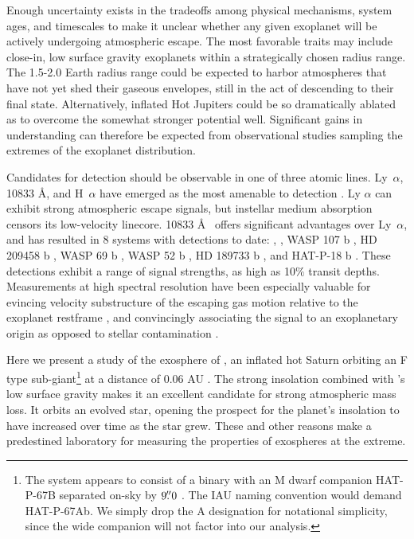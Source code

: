 \documentclass[twocolumn]{aastex631}
\begin{document}
Enough uncertainty exists in the tradeoffs among physical mechanisms, system ages, and timescales to make it unclear whether any given exoplanet will be actively undergoing atmospheric escape.  The most favorable traits may include close-in, low surface gravity exoplanets within a strategically chosen radius range.  The 1.5-2.0 Earth radius range could be expected to harbor atmospheres that have not yet shed their gaseous envelopes, still in the act of descending to their final state.  Alternatively, inflated Hot Jupiters could be so dramatically ablated as to overcome the somewhat stronger potential well.  Significant gains in understanding can therefore be expected from observational studies sampling the extremes of the exoplanet distribution.

Candidates for detection should be observable in one of three atomic lines.  Ly~$\alpha$,  10833 \AA, and H~$\alpha$ have emerged as the most amenable to detection \citep{2018ApJ...855L..11O,2023MNRAS.518.4357O}.  Ly $\alpha$ can exhibit strong atmospheric escape signals, but instellar medium  absorption censors its low-velocity linecore.   10833 \AA~ offers significant advantages over Ly~$\alpha$, and has resulted in 8 systems with detections to date:  \citep{2020ApJ...894...97N, 2021A&A...647A.129L},  \citep{2022AJ....163...68Z}, WASP 107 b \citep{2019A&A...623A..58A,2020AJ....159..115K}, HD 209458 b \citep{2019A&A...629A.110A}, WASP 69 b \citep{2020AJ....159..278V}, WASP 52 b \citep{2020AJ....159..278V}, HD 189733 b \citep{2021A&A...647A.129L}, and HAT-P-18 b \citep{2021ApJ...909L..10P}.  These detections exhibit a range of signal strengths, as high as 10$\%$ transit depths.  Measurements at high spectral resolution have been especially valuable for evincing velocity substructure of the escaping gas motion relative to the exoplanet restframe \citep{2019A&A...629A.110A,2020ApJ...894...97N}, and convincingly associating the signal to an exoplanetary origin as opposed to stellar contamination \citep{2018AJ....156..189C}.


Here we present a study of the exosphere of , an inflated hot Saturn orbiting an F type sub-giant\footnote{The system appears to consist of a binary with an M dwarf companion HAT-P-67B separated on-sky by $9\mbox{$.\!\!^{\prime\prime}$}0$ \citep{2019MNRAS.490.5088M}.  The IAU naming convention would demand HAT-P-67Ab.  We simply drop the A designation for notational simplicity, since the wide companion will not factor into our analysis.} at a distance of 0.06 AU \citep{2017AJ....153..211Z}.  The strong insolation combined with 's low surface gravity makes it an excellent candidate for strong atmospheric mass loss.  It orbits an evolved star, opening the prospect for the planet's insolation to have increased over time as the star grew.  These and other reasons make  a predestined laboratory for measuring the properties of exospheres at the extreme.
\end{document}
